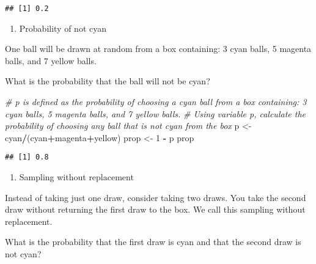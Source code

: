 \documentclass[
]{article}
\newenvironment{Shaded}{\begin{snugshade}}{\end{snugshade}}
\newcommand{\CommentTok}[1]{\textcolor[rgb]{0.56,0.35,0.01}{\textit{#1}}}
\newcommand{\DecValTok}[1]{\textcolor[rgb]{0.00,0.00,0.81}{#1}}
\newcommand{\NormalTok}[1]{#1}
\newcommand{\OperatorTok}[1]{\textcolor[rgb]{0.81,0.36,0.00}{\textbf{#1}}}
\newcommand{\StringTok}[1]{\textcolor[rgb]{0.31,0.60,0.02}{#1}}
\providecommand{\tightlist}{%
  \setlength{\itemsep}{0pt}\setlength{\parskip}{0pt}}
\begin{document}
\begin{verbatim}
## [1] 0.2
\end{verbatim}

\begin{enumerate}
\def\labelenumi{\arabic{enumi}.}
\setcounter{enumi}{1}
\tightlist
\item
  Probability of not cyan
\end{enumerate}

One ball will be drawn at random from a box containing: 3 cyan balls, 5
magenta balls, and 7 yellow balls.

What is the probability that the ball will not be cyan?

\begin{Shaded}
\begin{Highlighting}[]
\CommentTok{\# \textasciigrave{}p\textasciigrave{} is defined as the probability of choosing a cyan ball from a box containing: 3 cyan balls, 5 magenta balls, and 7 yellow balls.}
\CommentTok{\# Using variable \textasciigrave{}p\textasciigrave{}, calculate the probability of choosing any ball that is not cyan from the box}
\NormalTok{p \textless{}{-}}\StringTok{ }\NormalTok{cyan}\OperatorTok{/}\NormalTok{(cyan}\OperatorTok{+}\NormalTok{magenta}\OperatorTok{+}\NormalTok{yellow)}
\NormalTok{prop \textless{}{-}}\StringTok{ }\DecValTok{1} \OperatorTok{{-}}\StringTok{ }\NormalTok{p}
\NormalTok{prop}
\end{Highlighting}
\end{Shaded}

\begin{verbatim}
## [1] 0.8
\end{verbatim}

\begin{enumerate}
\def\labelenumi{\arabic{enumi}.}
\setcounter{enumi}{2}
\tightlist
\item
  Sampling without replacement
\end{enumerate}

Instead of taking just one draw, consider taking two draws. You take the
second draw without returning the first draw to the box. We call this
sampling without replacement.

What is the probability that the first draw is cyan and that the second
draw is not cyan?
\end{document}

